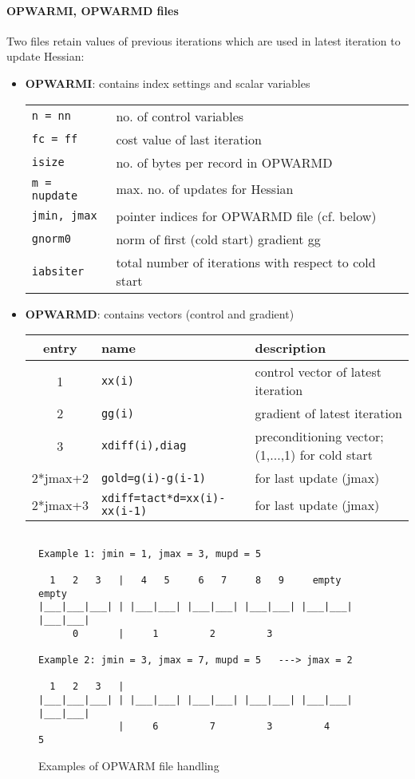 \paragraph{OPWARMI, OPWARMD files}
Two files retain values of previous iterations which are
used in latest iteration to update Hessian:
\begin{itemize}
%
\item {\bf OPWARMI}: contains index settings and scalar variables

{\footnotesize
\begin{tabular}{ll}
{\tt n  = nn}      & no. of control variables \\
{\tt fc = ff}      & cost value of last iteration \\
{\tt isize}        & no. of bytes per record in OPWARMD \\
{\tt m = nupdate}  & max. no. of updates for Hessian \\
{\tt jmin, jmax}   & pointer indices for OPWARMD file (cf. below) \\
{\tt gnorm0}       & norm of first (cold start) gradient gg \\
{\tt iabsiter}     & total number of iterations with respect to cold start
\end{tabular}
}
%
\item {\bf OPWARMD}: contains vectors (control and gradient)

{\scriptsize
\begin{tabular}{cll}
entry & name & description \\
\hline
     1    & {\tt xx(i)}         & control vector of latest iteration \\
     2    & {\tt gg(i)}         & gradient of latest iteration \\
     3    & {\tt xdiff(i),diag} & preconditioning vector; (1,...,1)
for cold start \\
 2*jmax+2 & {\tt gold=g(i)-g(i-1)} & for last update (jmax) \\
 2*jmax+3 & {\tt xdiff=tact*d=xx(i)-xx(i-1)} & for last update (jmax)
\end{tabular}
}
%
\end{itemize}
%
\begin{figure}[b!]
{\footnotesize
\begin{verbatim}

Example 1: jmin = 1, jmax = 3, mupd = 5

  1   2   3   |   4   5     6   7     8   9     empty     empty
|___|___|___| | |___|___| |___|___| |___|___| |___|___| |___|___|
      0       |     1         2         3

Example 2: jmin = 3, jmax = 7, mupd = 5   ---> jmax = 2

  1   2   3   |  
|___|___|___| | |___|___| |___|___| |___|___| |___|___| |___|___|
              |     6         7         3         4         5

\end{verbatim}
}
\caption{Examples of OPWARM file handling}
\label{fig:opwarm}
\end{figure}

